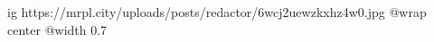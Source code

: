  
 
 
 
 

\ifcmt
  ig https://mrpl.city/uploads/posts/redactor/6wcj2uewzkxhz4w0.jpg
  @wrap center
  @width 0.7
\fi
